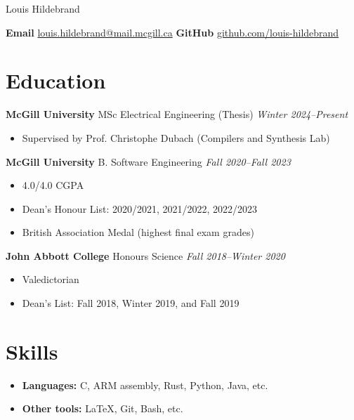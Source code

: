 \documentclass[12pt]{article}
\newenvironment{gitemize}{\begin{itemize} \color{mygrey}}{\end{itemize}}
\begin{document}

\pagestyle{empty}

\begin{center}
	\Huge
	Louis Hildebrand
\end{center}
\vspace{0.5\baselineskip}

\textbf{Email}
\href{mailto:louis.hildebrand@mail.mcgill.ca}{louis.hildebrand@mail.mcgill.ca}
\hfill
\textbf{GitHub}
\href{https://github.com/louis-hildebrand}{github.com/louis-hildebrand}

\section*{Education}

\textbf{McGill University} MSc Electrical Engineering (Thesis)
\hfill
\textit{Winter 2024--Present}
\begin{gitemize}
	\item Supervised by Prof. Christophe Dubach (Compilers and Synthesis Lab)
\end{gitemize}

\textbf{McGill University} B. Software Engineering
\hfill
\textit{Fall 2020--Fall 2023}
\begin{gitemize}
	\item 4.0/4.0 CGPA
	\item Dean's Honour List: 2020/2021, 2021/2022, 2022/2023
	\item British Association Medal (highest final exam grades)
\end{gitemize}

\textbf{John Abbott College} Honours Science
\hfill
\textit{Fall 2018--Winter 2020}
\begin{gitemize}
	\item Valedictorian
	\item Dean's List: Fall 2018, Winter 2019, and Fall 2019
\end{gitemize}

\section*{Skills}

\begin{itemize}
	\item \textbf{Languages:} C, ARM assembly, Rust, Python, Java, etc.
	\item \textbf{Other tools:} \LaTeX, Git, Bash, etc.
\end{itemize}
\end{document}
